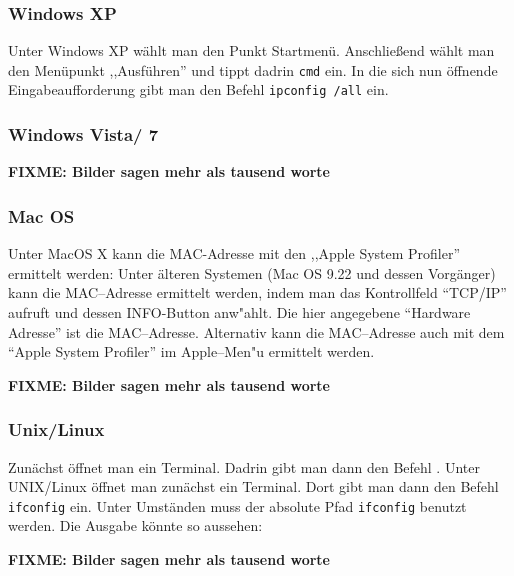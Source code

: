 \subsubsection*{Windows XP}
Unter Windows XP wählt man den Punkt Startmenü. Anschließend wählt man
den Menüpunkt ,,Ausführen'' und tippt dadrin \texttt{cmd} ein. In die sich
nun öffnende Eingabeaufforderung gibt man den Befehl \texttt{ipconfig /all}
ein.


\subsubsection*{Windows Vista/ 7}

\textbf{FIXME: Bilder sagen mehr als tausend worte}


\subsubsection*{Mac OS}

Unter MacOS X kann die MAC-Adresse mit den ,,Apple System Profiler''
ermittelt werden: %
Unter älteren Systemen (Mac OS 9.22 und dessen Vorgänger) kann 
die MAC--Adresse ermittelt werden, indem man das
Kontrollfeld "`TCP/IP"' aufruft und dessen INFO-Button anw"ahlt. Die hier
angegebene "`Hardware Adresse"' ist die MAC--Adresse. Alternativ kann die
MAC--Adresse auch mit dem "`Apple System Profiler"' im Apple--Men"u ermittelt
werden. 

\textbf{FIXME: Bilder sagen mehr als tausend worte}

\subsubsection*{Unix/Linux}
Zunächst öffnet man ein Terminal. Dadrin gibt man dann den Befehl 
. Unter
\glossar UNIX/Linux öffnet man zunächst ein Terminal. Dort gibt man
dann den Befehl \texttt{ifconfig} ein. Unter Umständen muss der
absolute Pfad \texttt{ifconfig} benutzt werden. Die Ausgabe könnte so
aussehen: %

\textbf{FIXME: Bilder sagen mehr als tausend worte}
